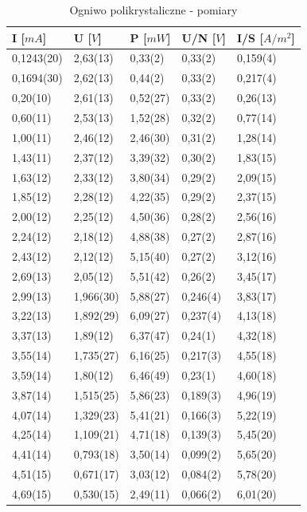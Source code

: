 \documentclass[12pt,a4paper]{article}
\begin{document}
\begin{table}[H]
\centering
\caption{Ogniwo polikrystaliczne - pomiary}
\label{poliwyniki}
\begin{tabular}{|p{2cm}|p{2cm}|p{2cm}|p{2cm}|p{2cm}|}
\hline
I {[}$mA${]}	& U {[}$V${]}	& P  {[}$mW${]}	& U/N {[}$V${]}	& I/S {[}$A/m^2${]} \\
\hline
0,1243(20)		& 2,63(13)		& 0,33(2)		& 0,33(2)		& 0,159(4)\\
0,1694(30)		& 2,62(13)		& 0,44(2)		& 0,33(2)		& 0,217(4)\\
0,20(10)		& 2,61(13)		& 0,52(27)		& 0,33(2)		& 0,26(13)\\
0,60(11)		& 2,53(13)		& 1,52(28)		& 0,32(2)		& 0,77(14)\\
1,00(11)		& 2,46(12)		& 2,46(30)		& 0,31(2)		& 1,28(14)\\
1,43(11)		& 2,37(12)		& 3,39(32)		& 0,30(2)		& 1,83(15)\\
1,63(12)		& 2,33(12)		& 3,80(34)		& 0,29(2)		& 2,09(15)\\
1,85(12)		& 2,28(12)		& 4,22(35)		& 0,29(2)		& 2,37(15)\\
2,00(12)		& 2,25(12)		& 4,50(36)		& 0,28(2)		& 2,56(16)\\
2,24(12)		& 2,18(12)		& 4,88(38)		& 0,27(2)		& 2,87(16)\\
2,43(12)		& 2,12(12)		& 5,15(40)		& 0,27(2)		& 3,12(16)\\
2,69(13)		& 2,05(12)		& 5,51(42)		& 0,26(2)		& 3,45(17)\\
2,99(13)		& 1,966(30)		& 5,88(27)		& 0,246(4)		& 3,83(17)\\
3,22(13)		& 1,892(29)		& 6,09(27)		& 0,237(4)		& 4,13(18)\\
3,37(13)		& 1,89(12)		& 6,37(47)		& 0,24(1)		& 4,32(18)\\
3,55(14)		& 1,735(27)		& 6,16(25)		& 0,217(3)		& 4,55(18)\\
3,59(14)		& 1,80(12)		& 6,46(49)		& 0,23(1)		& 4,60(18)\\
3,87(14)		& 1,515(25)		& 5,86(23)		& 0,189(3)		& 4,96(19)\\
4,07(14)		& 1,329(23)		& 5,41(21)		& 0,166(3)		& 5,22(19)\\
4,25(14)		& 1,109(21)		& 4,71(18)		& 0,139(3)		& 5,45(20)\\
4,41(14)		& 0,793(18)		& 3,50(14)		& 0,099(2)		& 5,65(20)\\
4,51(15)		& 0,671(17)		& 3,03(12)		& 0,084(2)		& 5,78(20)\\
4,69(15)		& 0,530(15)		& 2,49(11)		& 0,066(2)		& 6,01(20)\\
\hline
\end{tabular}
\end{table}
\end{document}
